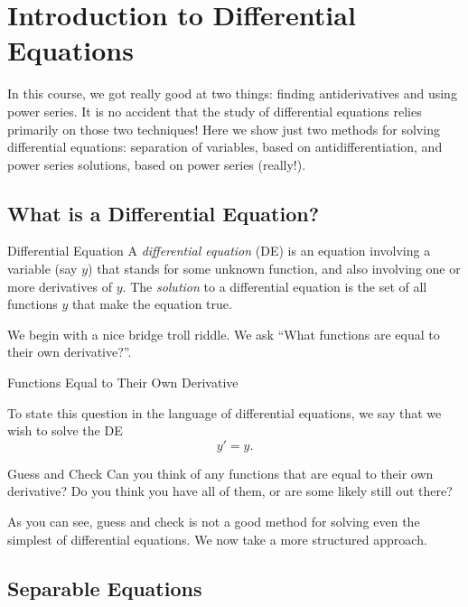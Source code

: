 \chapter{Introduction to Differential Equations}\label{diffeq}

In this course, we got really good at two things: finding antiderivatives and using power series.  It is no accident that the study of differential equations relies primarily on those two techniques!  Here we show just two methods for solving differential equations: separation of variables, based on antidifferentiation, and power series solutions, based on power series (really!). 

\section{What is a Differential Equation?}

\begin{definition}{Differential Equation}
A \emph{differential equation} (DE) is an equation involving a variable (say $y$) that stands for some unknown function, and also involving one or more derivatives of $y$.  The \emph{solution} to a differential equation is the set of all functions $y$ that make the equation true.
\end{definition}

We begin with a nice bridge troll riddle.  We ask ``What functions are equal to their own derivative?''.

\begin{example}{Functions Equal to Their Own Derivative}

To state this question in the language of differential equations, we say that we wish to solve the DE $$y'=y. $$

\end{example}

\begin{exercise}{Guess and Check \Coffeecup}
Can you think of any functions that are equal to their own derivative?  Do you think you have all of them, or are some likely still out there?
\vspace*{1in}
\end{exercise}
As you can see, guess and check is not a good method for solving even the simplest of differential equations.  We now take a more structured approach.

\section{Separable Equations}

